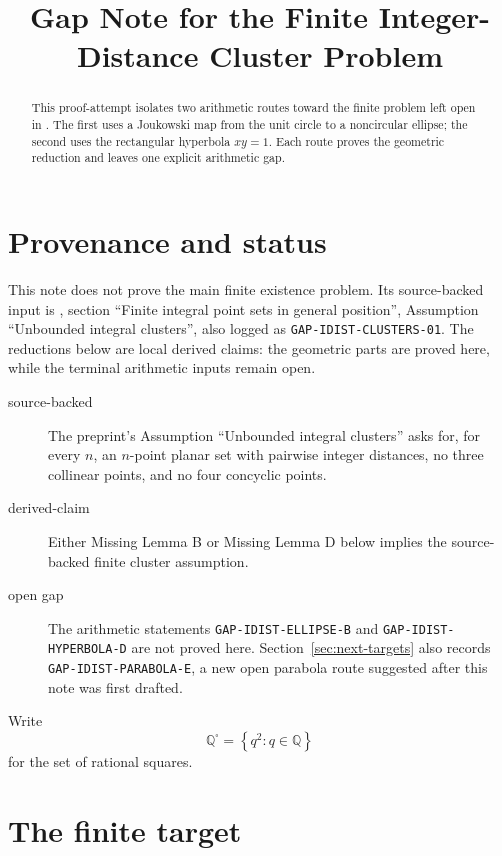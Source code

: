 \documentclass[11pt]{article}
\title{Gap Note for the Finite Integer-Distance Cluster Problem}
\author{}
\date{}
\theoremstyle{definition}
\theoremstyle{remark}
\newcommand{\Q}{\mathbb{Q}}
\newcommand{\Qs}{\Q^{\square}}
\newcommand{\set}[1]{\left\{#1\right\}}
\begin{document}
\maketitle

\begin{abstract}
This proof-attempt isolates two arithmetic routes toward the finite problem left
open in .  The first uses a
Joukowski map from the unit circle to a noncircular ellipse; the second uses the
rectangular hyperbola \(xy=1\).  Each route proves the geometric reduction and
leaves one explicit arithmetic gap.
\end{abstract}

\section{Provenance and status}

This note does not prove the main finite existence problem.  Its source-backed
input is , section ``Finite
integral point sets in general position'', Assumption ``Unbounded integral
clusters'', also logged as \texttt{GAP-IDIST-CLUSTERS-01}.  The reductions below
are local derived claims: the geometric parts are proved here, while the terminal
arithmetic inputs remain open.

\begin{description}
\item[source-backed]
The preprint's Assumption ``Unbounded integral clusters'' asks for, for every
\(n\), an \(n\)-point planar set with pairwise integer distances, no three
collinear points, and no four concyclic points.

\item[derived-claim]
Either Missing Lemma B or Missing Lemma D below implies the source-backed
finite cluster assumption.

\item[open gap]
The arithmetic statements \texttt{GAP-IDIST-ELLIPSE-B} and
\texttt{GAP-IDIST-HYPERBOLA-D} are not proved here.  Section~\ref{sec:next-targets}
also records \texttt{GAP-IDIST-PARABOLA-E}, a new open parabola route suggested
after this note was first drafted.
\end{description}

Write
\[
\Qs=\set{q^2:q\in\Q}
\]
for the set of rational squares.

\section{The finite target}
\end{document}
